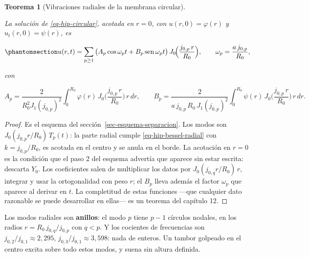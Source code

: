 \documentclass[
  spanish,
  a4paper,
]{scrbook}
\theoremstyle{definition}
\theoremstyle{plain}
\theoremstyle{definition}
\theoremstyle{plain}
\newtheorem{theorem}{Teorema}[chapter]
\theoremstyle{definition}
\theoremstyle{remark}
\begin{document}
\begin{theorem}[Vibraciones radiales de la membrana
circular]\protect\hypertarget{thm-hip-circular}{}\label{thm-hip-circular}

La solución de \ref{eq-hip-circular}, acotada en \(r=0\), con
\(u(r,0) = \varphi(r)\) y \(u_t(r,0) = \psi(r)\), es

\begin{equation}\protect\phantomsection\label{eq-hip-circular-sol}{
u(r,t) = \sum_{p\ge1}\big(A_p\cos\omega_pt + B_p\operatorname{sen}\omega_pt\big)\,J_0\!\Big(\frac{j_{0,p}\,r}{R_0}\Big),
\qquad \omega_p = \frac{a\,j_{0,p}}{R_0},
}\end{equation}

con

\[
A_p = \frac{2}{R_0^2J_1(j_{0,p})^2}\int_0^{R_0}\varphi(r)\,J_0\!\Big(\frac{j_{0,p}\,r}{R_0}\Big)\,r\,dr,
\qquad
B_p = \frac{2}{a\,j_{0,p}\,R_0\,J_1(j_{0,p})^2}\int_0^{R_0}\psi(r)\,J_0\!\Big(\frac{j_{0,p}\,r}{R_0}\Big)\,r\,dr .
\]

\end{theorem}

\begin{proof}
Es el esquema del sección~\ref{sec-esquema-separacion}. Los modos son
\(J_0(j_{0,p}r/R_0)\,T_p(t)\): la parte radial cumple
\ref{eq-hip-bessel-radial} con \(k = j_{0,p}/R_0\), es acotada en el
centro y se anula en el borde. La acotación en \(r = 0\) es la condición
que el paso 2 del esquema advertía que aparece sin estar escrita:
descarta \(Y_0\). Los coeficientes salen de multiplicar los datos por
\(J_0(j_{0,q}r/R_0)\,r\), integrar y usar la ortogonalidad con peso
\(r\); el \(B_p\) lleva además el factor \(\omega_p\) que aparece al
derivar en \(t\). La completitud de estas funciones ---que cualquier
dato razonable se puede desarrollar en ellas--- es un teorema del
capítulo 12.
\end{proof}

Los modos radiales son \textbf{anillos}: el modo \(p\) tiene \(p-1\)
círculos nodales, en los radios \(r = R_0\,j_{0,q}/j_{0,p}\) con
\(q<p\). Y los cocientes de frecuencias son
\(j_{0,2}/j_{0,1}\approx 2{,}295\), \(j_{0,3}/j_{0,1}\approx 3{,}598\):
nada de enteros. Un tambor golpeado en el centro excita sobre todo estos
modos, y suena sin altura definida.
\end{document}
